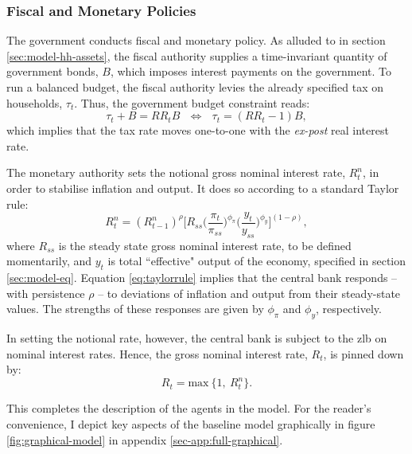 \documentclass[a4paper,12pt]{article} %
\numberwithin{equation}{section} %
\numberwithin{figure}{section}
\numberwithin{table}{section}
\begin{document}
\subsubsection{Fiscal and Monetary Policies}
\label{sec:model-policy}

The government conducts fiscal and monetary policy. As alluded to in section \ref{sec:model-hh-assets}, the fiscal authority supplies a time-invariant quantity of government bonds, $B$, which imposes interest payments on the government. To run a balanced budget, the fiscal authority levies the already specified tax on households, $\tau_t$. Thus, the government budget constraint reads:
\begin{equation}
    \tau_t + B = RR_t B \ \ \ \Leftrightarrow \ \ \ \tau_t = (RR_t - 1)B, \label{eq:fiscal-budget}
\end{equation}
which implies that the tax rate moves one-to-one with the \textit{ex-post} real interest rate.

The monetary authority sets the notional gross nominal interest rate, $R_{t}^n$, in order to stabilise inflation and output. It does so according to a standard Taylor rule:
\begin{equation}
    R_{t}^n = ( R_{t-1}^n )^{\rho} \Bigg[ R_{ss} \Bigg( \frac{\pi_t}{\pi_{ss}} \Bigg)^{\phi_{\pi}} \Bigg( \frac{y_t}{y_{ss}} \Bigg)^{\phi_y} \Bigg]^{(1-\rho)}, \label{eq:taylorrule}
\end{equation}
where $R_{ss}$ is the steady state gross nominal interest rate, to be defined momentarily, and $y_t$ is total ``effective" output of the economy, specified in section \ref{sec:model-eq}. Equation \eqref{eq:taylorrule} implies that the central bank responds -- with persistence $\rho$ -- to deviations of inflation and output from their steady-state values. The strengths of these responses are given by $\phi_{\pi}$ and $\phi_y$, respectively. 

In setting the notional rate, however, the central bank is subject to the \Gls{zlb} on nominal interest rates. Hence, the gross nominal interest rate, $R_t$, is pinned down by: %
\begin{equation}
    R_t = \text{max} \ \{ 1, \ R_{t}^n \}. \label{eq:zlb}
\end{equation}

This completes the description of the agents in the model. For the reader's convenience, I depict key aspects of the baseline model graphically in figure \ref{fig:graphical-model} in appendix \ref{sec-app:full-graphical}.
\end{document}
